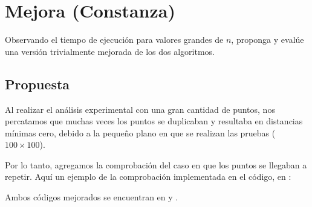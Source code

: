\documentclass[informe.tex]{subfiles}
\begin{document}
\section{Mejora (Constanza)}

Observando el tiempo de ejecución para valores grandes de $n$, proponga y evalúe una versión
trivialmente mejorada de los dos algoritmos.


\subsection{Propuesta}
Al realizar el análisis experimental con una gran cantidad de puntos, nos percatamos que muchas
veces los puntos se duplicaban y resultaba en distancias mínimas cero, debido a la pequeño plano en
que se realizan las pruebas ($100 \times 100$).

Por lo tanto, agregamos la comprobación del caso en que los puntos se llegaban a repetir.
Aquí un ejemplo de la comprobación implementada en el código, en :
\vspace{1em}

\vspace{1em}
Ambos códigos mejorados se encuentran en  y
.
\end{document}
